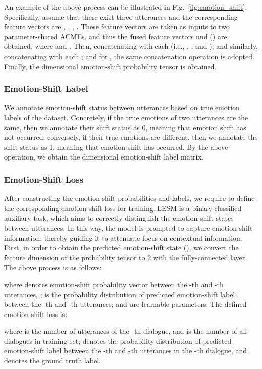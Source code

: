 \documentclass[journal]{IEEEtran}
\begin{document}
An example of the above process can be illustrated in Fig.~\ref{fig:emotion_shift}. Specifically, assume that there exist three utterances and the corresponding feature vectors are , , , . These feature vectors are taken as inputs to two parameter-shared ACMEs, and thus the fused feature vectors  and  () are obtained, where  and . Then, concatenating  with each  (i.e., , , and ); and similarly, concatenating  with each ; and for , the same concatenation operation is adopted. Finally, the  dimensional emotion-shift probability tensor  is obtained.

\subsubsection{Emotion-Shift Label}
We annotate emotion-shift status between utterances based on true emotion labels of the dataset. Concretely, if the true emotions of two utterances are the same, then we annotate their shift status as 0, meaning that emotion shift has not occurred; conversely, if their true emotions are different, then we annotate the shift status as 1, meaning that emotion shift has occurred. By the above operation, we obtain the  dimensional emotion-shift label matrix.

\subsubsection{Emotion-Shift Loss} 
After constructing the emotion-shift probabilities and labels, we require to define the corresponding emotion-shift loss for training. LESM is a binary-classified auxiliary task, which aims to correctly distinguish the emotion-shift states between utterances. In this way, the model is prompted to capture emotion-shift information, thereby guiding it to attenuate focus on contextual information. First, in order to obtain the predicted emotion-shift state  (), we convert the feature dimension of the probability tensor  to 2 with the fully-connected layer. The above process is as follows:

where  denotes emotion-shift probability vector between the -th and -th utterances, ;  is the probability distribution of predicted emotion-shift label between the -th and -th utterances;  and  are learnable parameters. The defined emotion-shift loss is:

where  is the number of utterances of the -th dialogue, and  is the number of all dialogues in training set;  denotes the probability distribution of predicted emotion-shift label between the -th and -th utterances in the -th dialogue, and  denotes the ground truth label.
\end{document}
